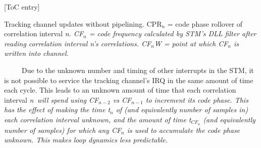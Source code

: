 \documentclass{article}
\begin{document}
\begin{center}
[ToC entry]{\small Tracking channel updates without pipelining. CPR$_n$ = code phase rollover of correlation interval \it n\normalfont. CF$_n$ = code frequency calculated by STM's DLL filter after reading correlation interval \it n\normalfont's correlations. CF$_n$W = point at which CF$_n$ is written into channel. \par\ \ \ \ \ Due to the unknown number and timing of other interrupts in the STM, it is not possible to service the tracking channel's IRQ in the same amount of time each cycle. This leads to an unknown amount of time that each correlation interval \it n\normalfont\ will spend using CF$_{n-2}$ vs CF$_{n-1}$ to increment its code phase. This has the effect of making the time t$_n$ of (and equivalently number of samples in) each correlation interval unknown, and the amount of time t$_{CF_n}$ (and equivalently number of samples) for which any CF$_n$ is used to accumulate the code phase unknown. This makes loop dynamics less predictable.}
\end{center}

\hypertarget{fig5}{}
\end{document}
